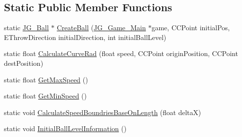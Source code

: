 \subsection*{Static Public Member Functions}
\begin{DoxyCompactItemize}
\item 
static \hyperlink{class_j_g___ball}{J\-G\-\_\-\-Ball} $\ast$ \hyperlink{class_j_g___ball_abbe12dcab0612bc318c8b5634196ce99}{Create\-Ball} (\hyperlink{class_j_g___game___main}{J\-G\-\_\-\-Game\-\_\-\-Main} $\ast$game, C\-C\-Point initial\-Pos, E\-Throw\-Direction initial\-Direction, int initial\-Ball\-Level)
\item 
static float \hyperlink{class_j_g___ball_ad78631bbe37237b14c801b3c919ca5db}{Calculate\-Curve\-Rad} (float speed, C\-C\-Point origin\-Position, C\-C\-Point dest\-Position)
\item 
static float \hyperlink{class_j_g___ball_aaa52c9cb759d464568dda65e41556b2f}{Get\-Max\-Speed} ()
\item 
static float \hyperlink{class_j_g___ball_a560d13dad6f86db6c28babb5d69d5058}{Get\-Min\-Speed} ()
\item 
static void \hyperlink{class_j_g___ball_a76c7ac5979489b8f91ab06ddd7f3560d}{Calculate\-Speed\-Boundries\-Base\-On\-Length} (float delta\-X)
\item 
static void \hyperlink{class_j_g___ball_a6f93596e22d858ef50de2914d61387a3}{Initial\-Ball\-Level\-Information} ()
\end{DoxyCompactItemize}
